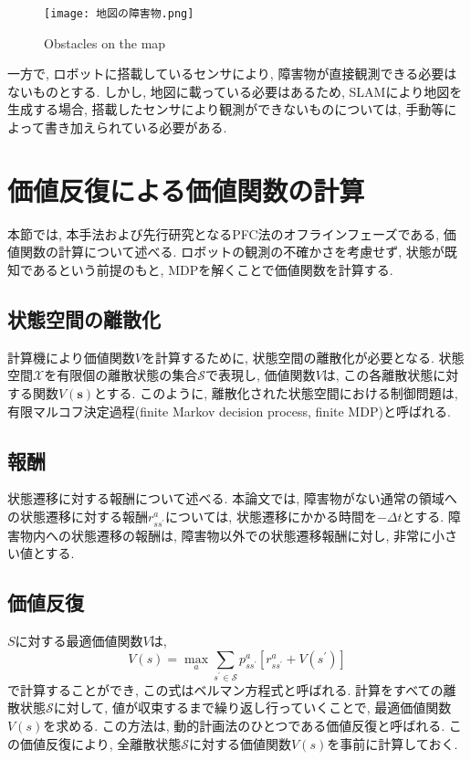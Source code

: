 \begin{figure}[h]
  \begin{center}
    \texttt{[image: 地図の障害物.png]}
    \caption{Obstacles on the map}
    \label{fig:地図の障害物}
  \end{center}
\end{figure}

一方で, ロボットに搭載しているセンサにより, 障害物が直接観測できる必要はないものとする. 
しかし, 地図に載っている必要はあるため, SLAMにより地図を生成する場合, 
搭載したセンサにより観測ができないものについては, 手動等によって書き加えられている必要がある. 


\section{価値反復による価値関数の計算} \label{section:価値関数}
本節では, 本手法および先行研究となるPFC法のオフラインフェーズである, 価値関数の計算について述べる. 
ロボットの観測の不確かさを考慮せず, 状態が既知であるという前提のもと, MDPを解くことで価値関数を計算する. 

\subsection{状態空間の離散化}
計算機により価値関数$V$を計算するために, 状態空間の離散化が必要となる. 
状態空間$\mathcal{X}$を有限個の離散状態の集合$\mathcal{S}$で表現し, 
価値関数$V$は, この各離散状態に対する関数$V(\bm{s})$とする. 
このように, 離散化された状態空間における制御問題は, 有限マルコフ決定過程(finite Markov decision process, finite MDP)と呼ばれる. 

\subsection{報酬} \label{subsection:報酬}
状態遷移に対する報酬について述べる. 
本論文では, 障害物がない通常の領域への状態遷移に対する報酬$r^{a}_{ss^{\prime}}$については, 状態遷移にかかる時間を$-\Delta t$とする. 
障害物内への状態遷移の報酬は, 障害物以外での状態遷移報酬に対し, 非常に小さい値とする. 

\subsection{価値反復}
$S$に対する最適価値関数$V$は, 
\begin{equation}
\label{bellman equation}
  V(s) = \max_{a} \sum_{s^{\prime} \in \mathcal{S}}
         p^{a}_{ss^{\prime}} \left[ r^{a}_{ss^{\prime}} + V(s^{\prime}) \right]
\end{equation}
で計算することができ, この式はベルマン方程式と呼ばれる. 
計算をすべての離散状態$\mathcal{S}$に対して, 値が収束するまで繰り返し行っていくことで, 最適価値関数$V(s)$を求める. 
この方法は, 動的計画法のひとつである価値反復と呼ばれる. 
この価値反復により, 全離散状態$\mathcal{S}$に対する価値関数$V(s)$を事前に計算しておく. 


